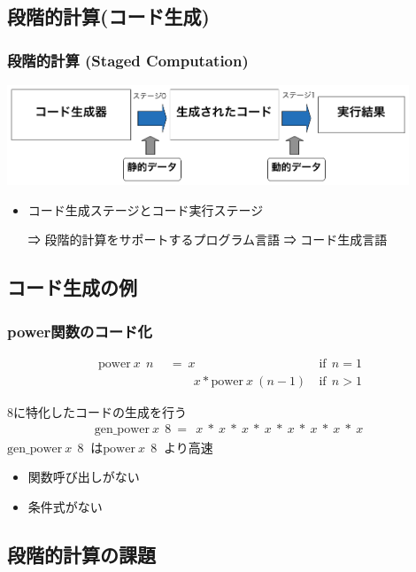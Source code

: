 \documentclass[dvipdfmx,cjk,xcolor=dvipsnames,envcountsect,notheorems,12pt]{beamer}
\theoremstyle{definition}
\begin{document}
\subsection{段階的計算(コード生成)}
\begin{frame}
  \frametitle{段階的計算 (Staged Computation)}
  \includegraphics[clip,width=12cm]{./img/prggen.png}
  \begin{itemize}
  \item コード生成ステージとコード実行ステージ
  \item[⇒] 段階的計算をサポートするプログラム言語 ⇒ コード生成言語
  \end{itemize}
\end{frame}

\subsection{コード生成の例}
\begin{frame}
  \frametitle{power関数のコード化}
  \begin{align*}
    \text{power} ~x~ ~n~ &~=~ x &\text{if} ~~n = 1 \\
                         &~~~\phantom{=}~ x * \text{power} ~x~ (n-1)~ &\text{if} ~~n > 1
  \end{align*}

  \pause
  8に特化したコードの生成を行う
  \begin{align*}
    \text{gen\_power} ~x~ ~8~ =~ ~x~ * ~x~ * ~x~ * ~x~ * ~x~ * ~x~ * ~x~ * ~x~
  \end{align*}
  \pause
  $\text{gen\_power} ~x~ ~8~$ は$\text{power} ~x~ ~8~$ より高速
  \begin{itemize}
  \item 関数呼び出しがない
  \item 条件式がない
  \end{itemize}
\end{frame}

\subsection{段階的計算の課題}
\end{document}
